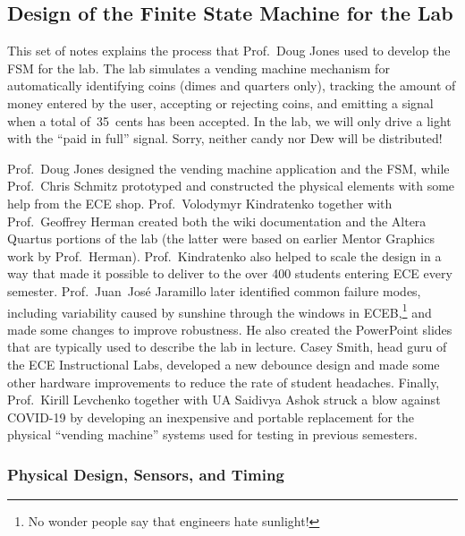 \classtitle

\subsection{Design of the Finite State Machine for the Lab}

This set of notes explains the process that Prof.~Doug Jones used to develop
the FSM for the lab.
%
The lab simulates a vending machine mechanism for automatically 
identifying coins (dimes and quarters only), tracking the amount 
of money entered by the user, accepting or rejecting 
coins, and emitting a signal when a total of~35~cents has been 
accepted.  In the lab, we will only drive a light with 
the ``paid in full'' signal.  
%
Sorry, neither candy nor Dew will be distributed!

Prof.~Doug Jones designed the vending machine application and the FSM,
while Prof.~Chris Schmitz prototyped and constructed the physical elements 
with some help from the ECE shop.
%
Prof.~Volodymyr Kindratenko together with Prof.~Geoffrey Herman created 
both the wiki documentation and the Altera Quartus portions of the lab
(the latter were based on earlier Mentor Graphics work by Prof.~Herman).
%
Prof.~Kindratenko also helped to scale the design 
in a way that made it possible to deliver to the over 400 students entering
ECE every semester.  
%
Prof.~Juan~Jos\'e Jaramillo later identified
common failure modes, including variability caused by sunshine through 
the windows in ECEB,\footnote{No wonder people say that engineers hate 
sunlight!} and made some changes to improve robustness.  He also
created the PowerPoint slides that are typically used to describe the lab in
lecture.  Casey Smith, head guru of the ECE Instructional Labs,
developed a new debounce design and made some other hardware 
improvements to reduce the rate of student headaches.
Finally, Prof.~Kirill Levchenko together with UA Saidivya Ashok
struck a blow against COVID-19 by developing an inexpensive and
portable replacement for the physical ``vending machine'' systems
used for testing in previous semesters.\\

\subsubsection{Physical Design, Sensors, and Timing}

